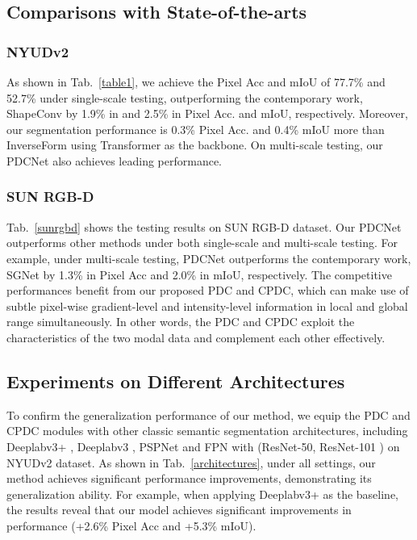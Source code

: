 \documentclass[lettersize,journal]{IEEEtran}
\begin{document}
\subsection{Comparisons with State-of-the-arts}
\subsubsection{NYUDv2} As shown in Tab.~\ref{table1}, we achieve the Pixel Acc and mIoU of 77.7\% and 52.7\% under single-scale testing, outperforming the contemporary work, ShapeConv \cite{cao2021shapeconv} by 1.9\% in and 2.5\% in Pixel Acc. and mIoU, respectively. Moreover, our segmentation performance is 0.3\% Pixel Acc. and 0.4\%
mIoU more than InverseForm \cite{borse2021inverseform} using Transformer as the backbone. On multi-scale testing, our PDCNet also achieves leading performance.

\subsubsection{SUN RGB-D} Tab.~\ref{sunrgbd} shows the testing results on SUN RGB-D dataset. Our PDCNet outperforms other methods under both single-scale and multi-scale testing. For example, under multi-scale testing, PDCNet outperforms the contemporary work, SGNet \cite{chen2021spatial} by 1.3\% in Pixel Acc and 2.0\% in mIoU, respectively.
The competitive performances benefit from our proposed PDC and CPDC, which can make use of subtle pixel-wise gradient-level and intensity-level information in local and global range simultaneously. In other words, the PDC and CPDC exploit the characteristics of the two modal data and complement each other effectively.

\subsection{Experiments on Different Architectures}
To confirm the generalization performance of our method, we equip the PDC and CPDC modules with other classic semantic segmentation architectures, including Deeplabv3+ \cite{chen2018encoder}, Deeplabv3 \cite{chen2017rethinking}, PSPNet \cite{lin2017feature}
and FPN \cite{zhao2017pyramid} with (ResNet-50, ResNet-101 \cite{he2016deep}) on NYUDv2 dataset. As shown in Tab.~\ref{architectures}, under all settings, our method achieves signiﬁcant performance improvements, demonstrating its generalization ability. For example, when applying Deeplabv3+ as the baseline, the
results reveal that our model achieves significant improvements in performance (+2.6\%
Pixel Acc and +5.3\% mIoU). 
\end{document}
